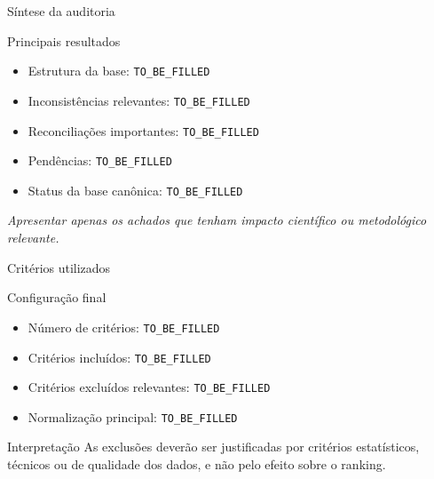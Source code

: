 \begin{frame}{Síntese da auditoria}

    \begin{block}{Principais resultados}
        \begin{itemize}
            \item Estrutura da base:
                  \texttt{TO\_BE\_FILLED}

            \item Inconsistências relevantes:
                  \texttt{TO\_BE\_FILLED}

            \item Reconciliações importantes:
                  \texttt{TO\_BE\_FILLED}

            \item Pendências:
                  \texttt{TO\_BE\_FILLED}

            \item Status da base canônica:
                  \texttt{TO\_BE\_FILLED}
        \end{itemize}
    \end{block}

    \vspace{0.2cm}

    \centering
    \textit{Apresentar apenas os achados que tenham impacto científico
    ou metodológico relevante.}

\end{frame}



\begin{frame}{Critérios utilizados}

    \begin{block}{Configuração final}
        \begin{itemize}
            \item Número de critérios:
                  \texttt{TO\_BE\_FILLED}

            \item Critérios incluídos:
                  \texttt{TO\_BE\_FILLED}

            \item Critérios excluídos relevantes:
                  \texttt{TO\_BE\_FILLED}

            \item Normalização principal:
                  \texttt{TO\_BE\_FILLED}
        \end{itemize}
    \end{block}

    \vspace{0.3cm}

    \begin{alertblock}{Interpretação}
        As exclusões deverão ser justificadas por critérios estatísticos,
        técnicos ou de qualidade dos dados, e não pelo efeito sobre o
        ranking.
    \end{alertblock}

\end{frame}


